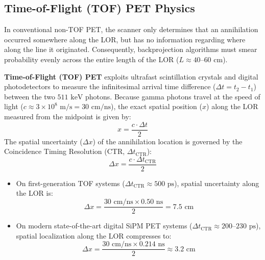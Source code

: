 \documentclass[11pt,a4paper]{article}
\begin{document}
\subsection{Time-of-Flight (TOF) PET Physics}
In conventional non-TOF PET, the scanner only determines that an annihilation occurred somewhere along the LOR, but has no information regarding where along the line it originated. Consequently, backprojection algorithms must smear probability evenly across the entire length of the LOR ($L \approx 40\text{--}60\text{ cm}$).

\textbf{Time-of-Flight (TOF) PET} exploits ultrafast scintillation crystals and digital photodetectors to measure the infinitesimal arrival time difference ($\Delta t = t_2 - t_1$) between the two $511\text{ keV}$ photons. Because gamma photons travel at the speed of light ($c \approx 3 \times 10^8\text{ m/s} = 30\text{ cm/ns}$), the exact spatial position ($x$) along the LOR measured from the midpoint is given by:
\begin{equation}
    x = \frac{c \cdot \Delta t}{2}
\end{equation}
The spatial uncertainty ($\Delta x$) of the annihilation location is governed by the Coincidence Timing Resolution (CTR, $\Delta t_{\text{CTR}}$):
\begin{equation}
    \Delta x = \frac{c \cdot \Delta t_{\text{CTR}}}{2}
\end{equation}
\begin{itemize}
    \item On first-generation TOF systems ($\Delta t_{\text{CTR}} \approx 500\text{ ps}$), spatial uncertainty along the LOR is:
    \begin{equation}
        \Delta x = \frac{30\text{ cm/ns} \times 0.50\text{ ns}}{2} = 7.5\text{ cm}
    \end{equation}
    \item On modern state-of-the-art digital SiPM PET systems ($\Delta t_{\text{CTR}} \approx 200\text{--}230\text{ ps}$), spatial localization along the LOR compresses to:
    \begin{equation}
        \Delta x = \frac{30\text{ cm/ns} \times 0.214\text{ ns}}{2} \approx 3.2\text{ cm}
    \end{equation}
\end{itemize}
\end{document}
